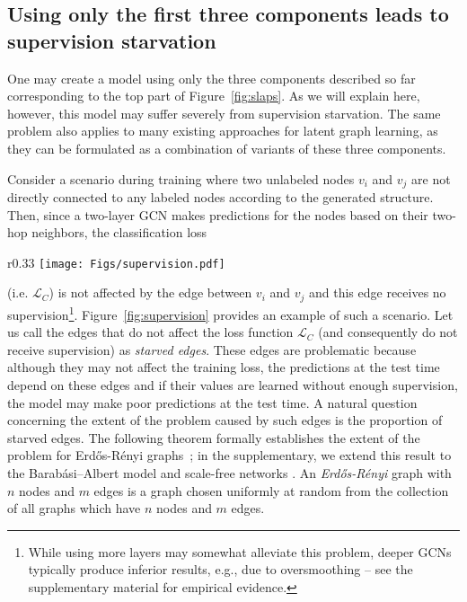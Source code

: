 \documentclass{article}
\newcommand{\loss}[1]{\ensuremath{\mathcal{#1}}}
\begin{document}
\subsection{Using only the first three components leads to supervision starvation} \label{sec:3comp}
One may create a model using only the three components described so far corresponding to the top part of Figure~\ref{fig:slaps}. As we will explain here, however, this model may suffer severely from supervision starvation. The same problem also applies to many existing approaches for latent graph learning, as they can be formulated as a combination of variants of these three components.

Consider a scenario during training where two unlabeled nodes $v_i$ and $v_j$ are not directly connected to any labeled nodes according to the generated structure. Then, since a two-layer GCN makes predictions for the nodes based on their two-hop neighbors, the classification loss 
\begin{wrapfigure}{r}{0.33\columnwidth}
    \centering
    \texttt{[image: Figs/supervision.pdf]}
    \caption{Using a two-layer GCN, the predictions made for the labeled nodes are not affected by the dashed (starved) edge.
    \label{fig:supervision}}
\end{wrapfigure}
(i.e. $\loss{L}_C$) is not affected by the edge between $v_i$ and $v_j$ and this edge receives no supervision\footnote{While using more layers may somewhat alleviate this problem, deeper GCNs typically produce inferior results, e.g., due to oversmoothing \citep[][]{li2018deeper,oono2020graph} -- see the supplementary material for empirical evidence.}.
Figure~\ref{fig:supervision} provides an example of such a scenario.
Let us call the edges that do not affect the loss function $\loss{L}_C$ (and consequently do not receive supervision) as \emph{starved edges}. These edges are problematic because although they may not affect the training loss, the predictions at the test time depend on these edges and if their values are learned without enough supervision, the model may make poor predictions at the test time. 
A natural question concerning the extent of the problem caused by such edges is the proportion of starved edges. The following theorem formally establishes the extent of the problem for Erd\H{o}s-R\'enyi graphs~\cite{erdos1959}; in the supplementary, we extend this result to the Barabási–Albert model \cite{albert2002statistical} and scale-free networks \cite{barabasi1999emergence}. An \emph{Erd\H{o}s-R\'enyi} graph with $n$ nodes and $m$ edges is a graph chosen uniformly at random from the collection of all graphs which have $n$ nodes and $m$ edges.
\end{document}
